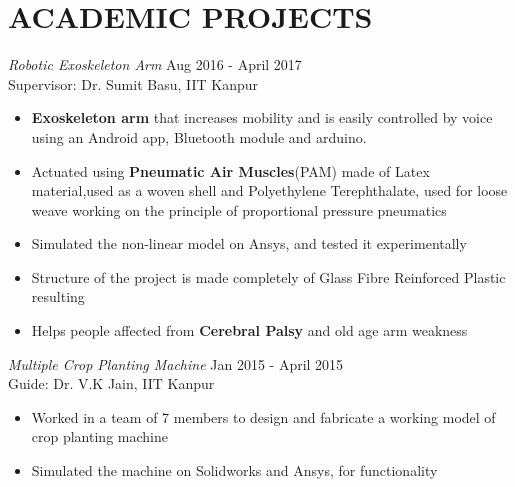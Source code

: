 \documentclass[margin, 10pt]{res} %
\begin{document}
\begin{resume}
\begin{itemize}
	
\end{itemize} 
\clearpage


\section{ACADEMIC PROJECTS} 
{\sl{Robotic Exoskeleton Arm}  } \hfill Aug 2016 - April 2017 \\
Supervisor: Dr. Sumit Basu, IIT Kanpur\\
\begin{itemize}

\item \textbf{Exoskeleton arm} that increases mobility and is easily controlled by voice using an Android app, Bluetooth module and arduino.
\item Actuated using \textbf{Pneumatic Air Muscles}(PAM) made of Latex material,used as a woven shell and Polyethylene Terephthalate, used for loose weave working on the principle of proportional pressure  pneumatics
\item Simulated the non-linear model on Ansys, and tested it experimentally 
\item Structure of the project is made completely of Glass Fibre Reinforced Plastic resulting 
\item Helps people affected from \textbf{Cerebral Palsy} and old age arm weakness
\end{itemize}


{\sl Multiple Crop Planting Machine} \hfill Jan 2015 - April 2015 \\
Guide: Dr. V.K Jain, IIT Kanpur\\
\begin{itemize} %
\item Worked in a team of 7 members to design and fabricate a working model of crop planting machine
\item Simulated the machine on Solidworks and Ansys, for functionality 

\end{itemize}




\end{resume}
\end{document}
